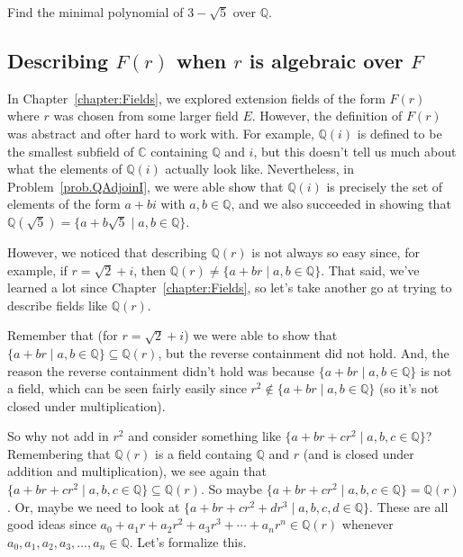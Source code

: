 \begin{problem}
Find the minimal polynomial of $3-\sqrt{5}$ over $\mathbb{Q}$.
\end{problem}

\subsection{Describing $F(r)$ when $r$ is algebraic over $F$}

In Chapter~\ref{chapter:Fields}, we explored extension fields of the form $F(r)$ where $r$ was chosen from some larger field $E$. However, the definition of $F(r)$ was abstract and ofter hard to work with. For example, $\mathbb{Q}(i)$ is defined to be the smallest subfield of $\mathbb{C}$ containing $\mathbb{Q}$ and $i$, but this doesn't tell us much about what the elements of $\mathbb{Q}(i)$ actually look like. Nevertheless, in Problem~\ref{prob.QAdjoinI}, we were able show that $\mathbb{Q}(i)$ is precisely the set of elements of the form $a+bi$ with $a,b\in \mathbb{Q}$, and we also succeeded in showing that $\mathbb{Q}(\sqrt{5}) = \{a+b\sqrt{5}\mid a,b\in \mathbb{Q}\}$. 

However, we noticed that describing $\mathbb{Q}(r)$ is not always so easy since, for example, if $r = \sqrt{2} + i$, then $\mathbb{Q}(r) \neq \{a+br\mid a,b\in \mathbb{Q}\}$. That said, we've learned a lot since Chapter~\ref{chapter:Fields}, so let's take another go at trying to describe fields like $\mathbb{Q}(r)$. 

Remember that (for $r = \sqrt{2} + i$) we were able to show that $\{a+br\mid a,b\in \mathbb{Q}\} \subseteq \mathbb{Q}(r)$, but the reverse containment did not hold. And, the reason the reverse containment didn't hold was because $\{a+br\mid a,b\in \mathbb{Q}\}$ is not a field, which can be seen fairly easily since $r^2 \notin \{a+br\mid a,b\in \mathbb{Q}\}$ (so it's not closed under multiplication). 

So why not add in $r^2$ and consider something like  $\{a+br + cr^2\mid a,b,c\in \mathbb{Q}\}$? Remembering that $\mathbb{Q}(r)$ is a field containg $\mathbb{Q}$ and $r$ (and is closed under addition and multiplication), we see again that $\{a+br + cr^2\mid a,b,c\in \mathbb{Q}\} \subseteq \mathbb{Q}(r)$. So maybe $\{a+br + cr^2\mid a,b,c\in \mathbb{Q}\} = \mathbb{Q}(r)$. Or, maybe we need to look at $\{a+br + cr^2 + dr^3\mid a,b,c,d\in \mathbb{Q}\}$. These are all good ideas since $a_0+a_1r + a_2r^2 + a_3r^3 + \cdots + a_nr^n \in \mathbb{Q}(r)$ whenever $a_0,a_1,a_2,a_3,\ldots,a_n\in \mathbb{Q}$. Let's formalize this.


